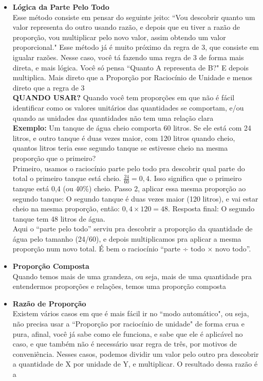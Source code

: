 \documentclass{article}
\begin{document}
\begin{itemize}
    \item \textbf{Lógica da Parte Pelo Todo} \\[5pt] Esse método consiste em pensar do seguinte jeito: ``Vou descobrir quanto um valor representa do outro usando razão, e depois que eu tiver a razão de proporção, vou multiplicar pelo novo valor, assim obtendo um valor proporcional." Esse método já é muito próximo da regra de 3, que consiste em igualar razões. Nesse caso, você tá fazendo uma regra de 3 de forma mais direta, e mais lógica. Você só pensa ``Quanto A representa de B?" E depois multiplica. Mais direto que a Proporção por Raciocínio de Unidade e menos direto que a regra de 3
    \\[5pt]
    \textbf{QUANDO USAR?} Quando você tem proporções em que não é fácil identificar como os valores unitários das quantidades se comportam, e/ou quando as unidades das quantidades não tem uma relação clara
    \\[5pt]
    \textbf{Exemplo:} Um tanque de água cheio comporta 60 litros. Se ele está com 24 litros, e outro tanque é duas vezes maior, com 120 litros quando cheio, quantos litros teria esse segundo tanque se estivesse cheio na mesma proporção que o primeiro?
    \\[5pt]
    Primeiro, usamos o raciocínio parte pelo todo pra descobrir qual parte do total o primeiro tanque está cheio. $\frac{24}{60}=0,4$. Isso significa que o primeiro tanque está 0,4 (ou 40\%) cheio. Passo 2, aplicar essa mesma proporção ao segundo tanque: O segundo tanque é duas vezes maior (120 litros), e vai estar cheio na mesma proporção, então: $0,4\times120=48$. Resposta final: O segundo tanque tem 48 litros de água.
    \\[5pt]
    Aqui o “parte pelo todo” serviu pra descobrir a proporção da quantidade de água pelo tamanho (24/60), e depois multiplicamos pra aplicar a mesma proporção num novo total. É bem o raciocínio “parte ÷ todo × novo todo”.
    
    \item \textbf{Proporção Composta}\\[5pt] Quando temos mais de uma grandeza, ou seja, mais de uma quantidade pra entendermos proporções e relações, temos uma proporção composta
    \item \textbf{Razão de Proporção}\\[5pt] Existem vários casos em que é mais fácil ir no ``modo automático", ou seja, não precisa usar a ``Proporção por raciocínio de unidade" de forma crua e pura, afinal, você já sabe como ele funciona, e sabe que ele é aplicável no caso, e que também não é necessário usar regra de três, por motivos de conveniência. Nesses casos, podemos dividir um valor pelo outro pra descobrir a quantidade de X por unidade de Y, e multiplicar. O resultado dessa razão é a 

\end{itemize}
\end{document}
